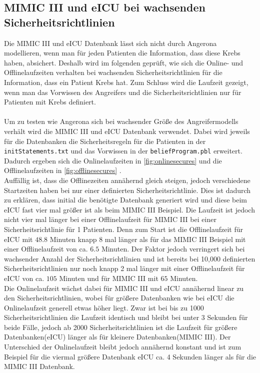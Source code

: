 \documentclass[german,version-2020-11]{uzl-thesis}
\begin{document}
\subsection{MIMIC III und eICU bei wachsenden Sicherheitsrichtlinien}
Die MIMIC III und eICU Datenbank lässt sich nicht durch Angerona modellieren, wenn man für jeden Patienten die Information, dass diese Krebs haben, absichert. Deshalb wird im folgenden geprüft, wie sich die Online- und Offlinelaufzeiten verhalten bei wachsenden Sicherheitsrichtlinien für die Information, dass ein Patient Krebs hat. Zum Schluss wird die Laufzeit gezeigt, wenn man das Vorwissen des Angreifers und die Sicherheitsrichtlinien nur für Patienten mit Krebs definiert. \\ \\
Um zu testen wie Angerona sich bei wachsender Größe des Angreifermodells verhält wird die MIMIC III und eICU Datenbank verwendet. Dabei wird jeweils für die Datenbanken die Sicherheitsregeln für die Patienten in der \texttt{initStatements.txt} und das Vorwissen in der \texttt{beliefProgram.pbl} erweitert. Dadurch ergeben sich die Onlinelaufzeiten in \autoref{fig:onlinesecures} und die Offlinelaufzeiten in \autoref{fig:offlinesecures} . \\ 
Auffällig ist, dass die Offlinezeiten annähernd gleich steigen, jedoch verschiedene Startzeiten haben bei nur einer definierten  Sicherheitsrichtlinie. Dies ist dadurch zu erklären, dass initial die benötigte Datenbank generiert wird und diese beim eICU fast vier mal größer ist als beim MIMIC III Beispiel. Die Laufzeit ist jedoch nicht vier mal länger bei einer Offlinelaufzeit für MIMIC III bei einer Sicherheitsrichtlinie für 1 Patienten. Denn zum Start ist die Offlinelaufzeit für eICU mit $48.8$ Minuten knapp 8 mal länger als für das MIMIC III Beispiel mit einer Offlinelaufzeit von ca. $6.5$ Minuten. Der Faktor jedoch verringert sich bei wachsender Anzahl der Sicherheitsrichtlinien und ist bereits bei 10,000 definierten Sicherheitsrichtlinien nur noch knapp 2 mal länger mit einer Offlinelaufzeit für eICU von ca. $105$ Minuten und für MIMIC III mit $65$ Minuten. \\ 
Die Onlinelaufzeit wächst dabei für MIMIC III und eICU annähernd linear zu den Sicherheitsrichtlinien, wobei für größere Datenbanken wie bei eICU die Onlinelaufzeit generell etwas höher liegt. Zwar ist bei bis zu 1000 Sicherheitsrichtlinien die Laufzeit identisch und bleibt bei unter 3 Sekunden für beide Fälle, jedoch ab 2000 Sicherheitsrichtlinien ist die Laufzeit für größere Datenbanken(eICU) länger als für kleinere Datenbanken(MIMIC III). Der Unterschied der Onlinelaufzeit bleibt jedoch annähernd konstant und ist zum Beispiel für die viermal größere Datenbank eICU ca. 4 Sekunden länger als für die MIMIC III Datenbank. 
\end{document}
